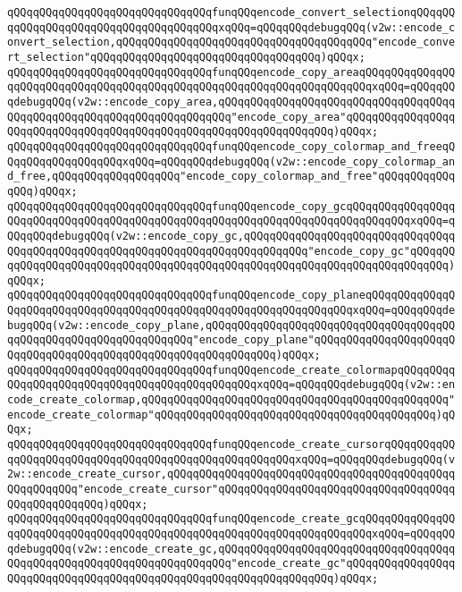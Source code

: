 \verb|qQQqqQQqqQQqqQQqqQQqqQQqqQQqqQQqfunqQQqencode_convert_selectionqQQqqQQqqQQqqQQqqQQqqQQqqQQqqQQqqQQqqQQqxqQQq=qQQqqQQqdebugqQQq(v2w::encode_convert_selection,qQQqqQQqqQQqqQQqqQQqqQQqqQQqqQQqqQQqqQQq"encode_convert_selection"qQQqqQQqqQQqqQQqqQQqqQQqqQQqqQQqqQQq)qQQqx;|\newline
\verb|qQQqqQQqqQQqqQQqqQQqqQQqqQQqqQQqfunqQQqencode_copy_areaqQQqqQQqqQQqqQQqqQQqqQQqqQQqqQQqqQQqqQQqqQQqqQQqqQQqqQQqqQQqqQQqqQQqqQQqxqQQq=qQQqqQQqdebugqQQq(v2w::encode_copy_area,qQQqqQQqqQQqqQQqqQQqqQQqqQQqqQQqqQQqqQQqqQQqqQQqqQQqqQQqqQQqqQQqqQQqqQQq"encode_copy_area"qQQqqQQqqQQqqQQqqQQqqQQqqQQqqQQqqQQqqQQqqQQqqQQqqQQqqQQqqQQqqQQqqQQq)qQQqx;|\newline
\verb|qQQqqQQqqQQqqQQqqQQqqQQqqQQqqQQqfunqQQqencode_copy_colormap_and_freeqQQqqQQqqQQqqQQqqQQqxqQQq=qQQqqQQqdebugqQQq(v2w::encode_copy_colormap_and_free,qQQqqQQqqQQqqQQqqQQq"encode_copy_colormap_and_free"qQQqqQQqqQQqqQQq)qQQqx;|\newline
\verb|qQQqqQQqqQQqqQQqqQQqqQQqqQQqqQQqfunqQQqencode_copy_gcqQQqqQQqqQQqqQQqqQQqqQQqqQQqqQQqqQQqqQQqqQQqqQQqqQQqqQQqqQQqqQQqqQQqqQQqqQQqqQQqxqQQq=qQQqqQQqdebugqQQq(v2w::encode_copy_gc,qQQqqQQqqQQqqQQqqQQqqQQqqQQqqQQqqQQqqQQqqQQqqQQqqQQqqQQqqQQqqQQqqQQqqQQqqQQqqQQq"encode_copy_gc"qQQqqQQqqQQqqQQqqQQqqQQqqQQqqQQqqQQqqQQqqQQqqQQqqQQqqQQqqQQqqQQqqQQqqQQqqQQq)qQQqx;|\newline
\verb|qQQqqQQqqQQqqQQqqQQqqQQqqQQqqQQqfunqQQqencode_copy_planeqQQqqQQqqQQqqQQqqQQqqQQqqQQqqQQqqQQqqQQqqQQqqQQqqQQqqQQqqQQqqQQqqQQqxqQQq=qQQqqQQqdebugqQQq(v2w::encode_copy_plane,qQQqqQQqqQQqqQQqqQQqqQQqqQQqqQQqqQQqqQQqqQQqqQQqqQQqqQQqqQQqqQQqqQQq"encode_copy_plane"qQQqqQQqqQQqqQQqqQQqqQQqqQQqqQQqqQQqqQQqqQQqqQQqqQQqqQQqqQQqqQQq)qQQqx;|\newline
\verb|qQQqqQQqqQQqqQQqqQQqqQQqqQQqqQQqfunqQQqencode_create_colormapqQQqqQQqqQQqqQQqqQQqqQQqqQQqqQQqqQQqqQQqqQQqqQQqxqQQq=qQQqqQQqdebugqQQq(v2w::encode_create_colormap,qQQqqQQqqQQqqQQqqQQqqQQqqQQqqQQqqQQqqQQqqQQqqQQq"encode_create_colormap"qQQqqQQqqQQqqQQqqQQqqQQqqQQqqQQqqQQqqQQqqQQq)qQQqx;|\newline
\verb|qQQqqQQqqQQqqQQqqQQqqQQqqQQqqQQqfunqQQqencode_create_cursorqQQqqQQqqQQqqQQqqQQqqQQqqQQqqQQqqQQqqQQqqQQqqQQqqQQqqQQqxqQQq=qQQqqQQqdebugqQQq(v2w::encode_create_cursor,qQQqqQQqqQQqqQQqqQQqqQQqqQQqqQQqqQQqqQQqqQQqqQQqqQQqqQQq"encode_create_cursor"qQQqqQQqqQQqqQQqqQQqqQQqqQQqqQQqqQQqqQQqqQQqqQQqqQQq)qQQqx;|\newline
\verb|qQQqqQQqqQQqqQQqqQQqqQQqqQQqqQQqfunqQQqencode_create_gcqQQqqQQqqQQqqQQqqQQqqQQqqQQqqQQqqQQqqQQqqQQqqQQqqQQqqQQqqQQqqQQqqQQqqQQqxqQQq=qQQqqQQqdebugqQQq(v2w::encode_create_gc,qQQqqQQqqQQqqQQqqQQqqQQqqQQqqQQqqQQqqQQqqQQqqQQqqQQqqQQqqQQqqQQqqQQqqQQq"encode_create_gc"qQQqqQQqqQQqqQQqqQQqqQQqqQQqqQQqqQQqqQQqqQQqqQQqqQQqqQQqqQQqqQQqqQQq)qQQqx;|\newline
